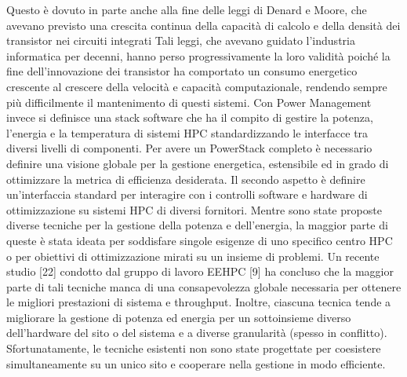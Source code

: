 Questo è dovuto in parte anche alla fine delle leggi di Denard e Moore, che avevano previsto una crescita continua della capacità di calcolo e della densità dei transistor nei circuiti integrati %
Tali leggi, che avevano guidato l'industria informatica per decenni, hanno perso progressivamente la loro validità poiché la fine dell'innovazione dei transistor %
ha comportato un consumo energetico crescente al crescere della velocità e capacità computazionale, rendendo sempre più difficilmente il mantenimento di questi sistemi. %
Con Power Management invece si definisce una stack software che ha il compito di gestire la potenza, l'energia e la temperatura di sistemi HPC standardizzando le interfacce tra diversi livelli di componenti. Per avere un PowerStack completo è necessario definire una visione globale per la gestione energetica, estensibile ed in grado di ottimizzare la metrica di efficienza desiderata. %
Il secondo aspetto è definire un'interfaccia standard per interagire con i controlli software e hardware di ottimizzazione su sistemi HPC di diversi fornitori.
Mentre sono state proposte diverse tecniche per la gestione della potenza e dell'energia, la maggior parte di queste è stata ideata per soddisfare singole esigenze di uno specifico centro HPC o per obiettivi di ottimizzazione mirati su un insieme di problemi. Un recente studio [22] condotto dal gruppo di lavoro EEHPC [9] ha concluso che la maggior parte di tali tecniche manca di una consapevolezza globale necessaria per ottenere le migliori prestazioni di sistema e throughput. Inoltre, ciascuna tecnica tende a migliorare la gestione di potenza ed energia per un sottoinsieme diverso dell'hardware del sito o del sistema e a diverse granularità (spesso in conflitto). Sfortunatamente, le tecniche esistenti non sono state progettate per coesistere simultaneamente su un unico sito e cooperare nella gestione in modo efficiente. %
